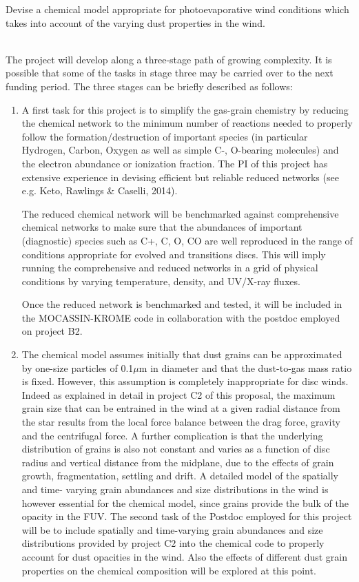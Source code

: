 \vspace{0.5em}

Devise a chemical model appropriate for photoevaporative wind conditions which takes into account of the varying dust properties in the wind. 

\vspace{0.5em}
\\
%
The project will develop along a three-stage path of growing complexity. It is possible that some of the tasks in stage three may be carried over to the next funding period. The three stages can be briefly described as follows: 
\begin{enumerate}
\item  A first task for this project is to simplify the gas-grain chemistry
by reducing the chemical network to the minimum number of reactions
needed to properly follow the formation/destruction of important
species (in particular Hydrogen, Carbon, Oxygen as well as simple C-,
O-bearing molecules) and the electron abundance or ionization
fraction. The PI of this project has extensive experience in devising efficient but reliable reduced networks (see e.g.  Keto, Rawlings \& Caselli, 2014). 

The reduced chemical network will be benchmarked against
comprehensive chemical networks to make sure that the abundances of
important (diagnostic) species such as C+, C, O, CO are well
reproduced in the range of conditions appropriate for evolved and
transitions discs. This will imply running the comprehensive and
reduced networks in a grid of physical conditions by varying
temperature, density, and UV/X-ray fluxes.  

Once the reduced network
is benchmarked and tested, it will be included in the MOCASSIN-KROME
code in collaboration with the postdoc employed on project B2. 

\item The chemical model assumes initially that dust grains can be
approximated by one-size particles of 0.1$\mu$m in diameter and that
the dust-to-gas mass ratio is fixed.  However, this assumption is
completely inappropriate for disc winds. Indeed as explained in detail
in project C2 of this proposal, the maximum grain size that can be
entrained in the wind at a given radial distance from the star results
from the local force balance between the drag force, gravity and the
centrifugal force. A further complication is that the underlying
distribution of grains is also not constant and varies as a function
of disc radius and vertical distance from the midplane, due to the
effects of grain growth, fragmentation, settling and drift. A detailed
model of the spatially and time- varying grain abundances and size
distributions in the wind is however essential for the chemical model,
since grains provide the bulk of the opacity in the FUV. The second
task of the Postdoc employed for this project will be to include
spatially and time-varying grain abundances and size distributions
provided by project C2 into the chemical code to properly account for
dust opacities in the wind.  Also the effects of different dust grain
properties on the chemical composition will be explored at this point.  


\end{enumerate}
